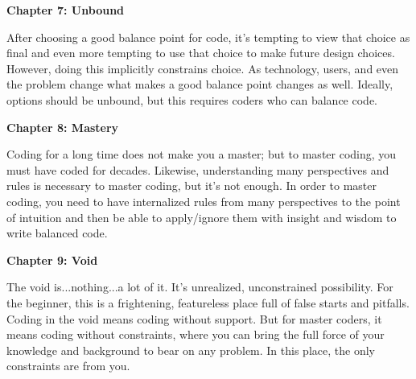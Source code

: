 \begin{adjustwidth}{0.25in}{0in}
\textbf{Chapter 7: Unbound}

After choosing a good balance point for code, it's tempting to view that choice
as final and even more tempting to use that choice to make future design
choices. However, doing this implicitly constrains choice. As technology,
users, and even the problem change what makes a good balance point changes as
well. Ideally, options should be unbound, but this requires coders who can
balance code. 

\textbf{Chapter 8: Mastery}

Coding for a long time does not make you a master; but to master coding, you
must have coded for decades. Likewise, understanding many perspectives and
rules is necessary to master coding, but it's not enough. In order to master
coding, you need to have internalized rules from many perspectives to the point
of intuition and then be able to apply/ignore them with insight and wisdom to
write balanced code.


\textbf{Chapter 9: Void}

The void is...nothing...a lot of it. It's unrealized, unconstrained
possibility. For the beginner, this is a frightening, featureless place full of
false starts and pitfalls.  Coding in the void means coding without support. But
for master coders, it means coding without constraints, where you can bring the
full force of your knowledge and background to bear on any problem. In this
place, the only constraints are from you.

\end{adjustwidth}
